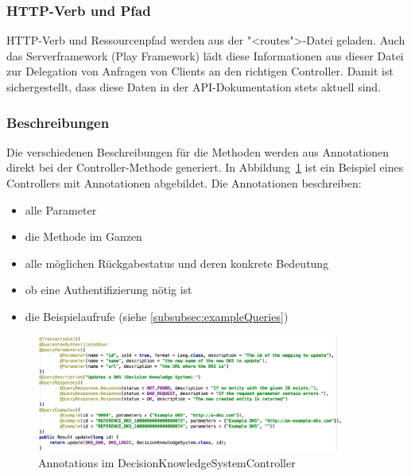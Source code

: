 		\subsubsection{HTTP-Verb und Pfad}
			HTTP-Verb und Ressourcenpfad werden aus der "<routes">-Datei geladen.
			Auch das Serverframework (Play Framework) lädt diese Informationen aus dieser Datei zur Delegation von Anfragen von Clients an den richtigen Controller.
			Damit ist sichergestellt, dass diese Daten in der API-Dokumentation stets aktuell sind.
			
		\subsubsection{Beschreibungen}
			Die verschiedenen Beschreibungen für die Methoden werden aus Annotationen direkt bei der Controller-Methode generiert.
			In Abbildung~\ref{fig:apiAnnotations} ist ein Beispiel eines Controllers mit Annotationen abgebildet.
			Die Annotationen beschreiben:
			\begin{itemize}
				\item{alle Parameter}
				\item{die Methode im Ganzen}
				\item{alle möglichen Rückgabestatus und deren konkrete Bedeutung}
				\item{ob eine Authentifizierung nötig ist}
				\item{die Beispielaufrufe (siehe \ref{subsubsec:exampleQueries})}
			\end{itemize}
			\begin{figure}[H]
				\includegraphics[width=0.9\textwidth]{interfacesAndProtocols/media/img/apiAnnotations.png}
				\centering
				\caption{Annotations im DecisionKnowledgeSystemController}
				\label{fig:apiAnnotations}
			\end{figure}
			
